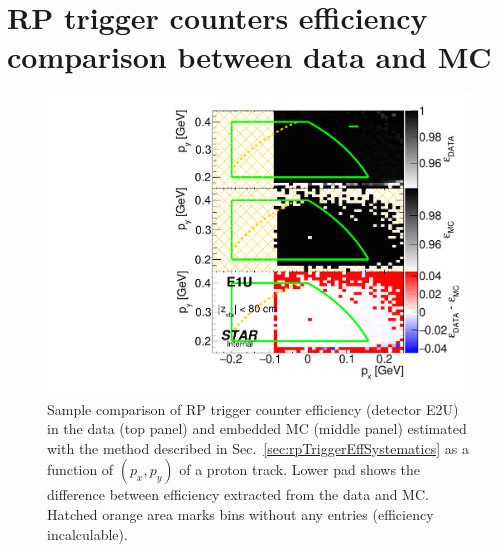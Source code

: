 
\chapter{RP trigger counters efficiency comparison between data and MC}\label{appendix:rpTrigEffSyst}%




\begin{figure}[h]%
	\centering
	\parbox{0.4725\textwidth}{
		\centering
		\includegraphics[width=\linewidth,page=2]{graphics/systematicsEfficiency/RpSyst/relativeTriggerEff2D_pxpy.pdf}%
	}
	\quad
	\parbox{0.4725\textwidth}{
		\centering\vspace*{-100pt}
		\caption[Coparison of estimated RP trigger counter efficiency in 2D (detector E2U).]%
    {Sample comparison of RP trigger counter efficiency (detector E2U) in the data (top panel) and embedded MC (middle panel) estimated with the method described in Sec.~\ref{sec:rpTriggerEffSystematics} as a function of $(p_{x},p_{y})$ of a proton track. Lower pad shows the difference between efficiency extracted from the data and MC. Hatched orange area marks bins without any entries (efficiency incalculable).%
    }
	}
	\label{fig:relativeRpRecoEff_E2U}
\end{figure}



